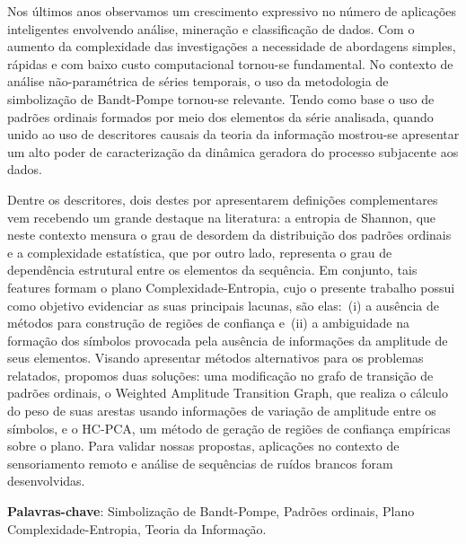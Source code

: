 Nos últimos anos observamos um crescimento expressivo no número de aplicações inteligentes envolvendo análise, mineração e classificação de dados.
Com o aumento da complexidade das investigações a necessidade de abordagens simples, rápidas e com baixo custo computacional tornou-se fundamental.
No contexto de análise não-paramétrica de séries temporais, o uso da metodologia de simbolização de Bandt-Pompe tornou-se relevante.
Tendo como base o uso de padrões ordinais formados por meio dos elementos da série analisada, quando unido ao uso de descritores causais da teoria da informação mostrou-se apresentar um alto poder de caracterização da dinâmica geradora do processo subjacente aos dados.


Dentre os descritores, dois destes por apresentarem definições complementares vem recebendo um grande destaque na literatura: a entropia de Shannon, que neste contexto mensura o grau de desordem da distribuição dos padrões ordinais e a complexidade estatística, que por outro lado, representa o grau de dependência estrutural entre os elementos da sequência.
Em conjunto, tais features formam o plano Complexidade-Entropia, cujo o presente trabalho possui como objetivo evidenciar as suas principais lacunas, são elas:~(i) a ausência de métodos para construção de regiões de confiança e~(ii) a ambiguidade na formação dos símbolos provocada pela ausência de informações da amplitude de seus elementos.
Visando apresentar métodos alternativos para os problemas relatados, propomos duas soluções: uma modificação no grafo de transição de padrões ordinais, o Weighted Amplitude Transition Graph, que realiza o cálculo do peso de suas arestas usando informações de variação de amplitude entre os símbolos, e o HC-PCA, um método de geração de regiões de confiança empíricas sobre o plano.
Para validar nossas propostas, aplicações no contexto de sensoriamento remoto e análise de sequências de ruídos brancos foram desenvolvidas.

\textbf{Palavras-chave}: Simbolização de Bandt-Pompe, Padrões ordinais, Plano Complexidade-Entropia, Teoria da Informação.

